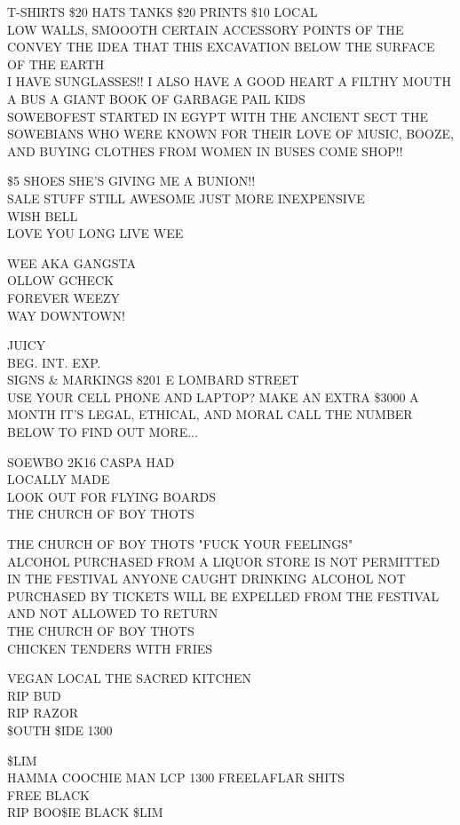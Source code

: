 \documentclass[10pt,letterpaper]{article}
\begin{document}
T{-}SHIRTS \$20 HATS TANKS \$20 PRINTS \$10 LOCAL\\
LOW WALLS, SMOOOTH CERTAIN ACCESSORY POINTS OF THE CONVEY THE IDEA THAT THIS EXCAVATION BELOW THE SURFACE OF THE EARTH\\
I HAVE SUNGLASSES!!  I ALSO HAVE A GOOD HEART A FILTHY MOUTH A BUS A GIANT BOOK OF GARBAGE PAIL KIDS\\
SOWEBOFEST STARTED IN EGYPT WITH THE ANCIENT SECT THE SOWEBIANS WHO WERE KNOWN FOR THEIR LOVE OF MUSIC, BOOZE, AND BUYING CLOTHES FROM WOMEN IN BUSES COME SHOP!!

\$5 SHOES SHE'S GIVING ME A BUNION!!\\
SALE STUFF STILL AWESOME JUST MORE INEXPENSIVE\\
WISH BELL\\
LOVE YOU LONG LIVE WEE

WEE AKA GANGSTA\\
OLLOW GCHECK\\
FOREVER WEEZY\\
WAY DOWNTOWN!

JUICY\\
BEG. INT. EXP.\\
SIGNS \& MARKINGS 8201 E LOMBARD STREET\\
USE YOUR CELL PHONE AND LAPTOP?  MAKE AN EXTRA \$3000 A MONTH IT'S LEGAL, ETHICAL, AND MORAL CALL THE NUMBER BELOW TO FIND OUT MORE...

SOEWBO 2K16 CASPA HAD\\
LOCALLY MADE\\
LOOK OUT FOR FLYING BOARDS\\
THE CHURCH OF BOY THOTS

THE CHURCH OF BOY THOTS "FUCK YOUR FEELINGS"\\
ALCOHOL PURCHASED FROM A LIQUOR STORE IS NOT PERMITTED IN THE FESTIVAL ANYONE CAUGHT DRINKING ALCOHOL NOT PURCHASED BY TICKETS WILL BE EXPELLED FROM THE FESTIVAL AND NOT ALLOWED TO RETURN\\
THE CHURCH OF BOY THOTS\\
CHICKEN TENDERS WITH FRIES

VEGAN LOCAL THE SACRED KITCHEN\\
RIP BUD\\
RIP RAZOR\\
\$OUTH \$IDE 1300

\$LIM\\
HAMMA COOCHIE MAN LCP 1300 FREELAFLAR SHITS\\
FREE BLACK\\
RIP BOO\$IE BLACK \$LIM
\end{document}
